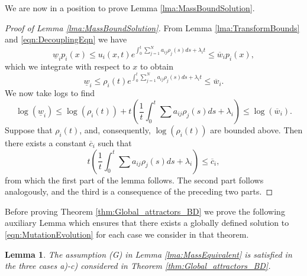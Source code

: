 \documentclass{article}
\newtheorem{lemma}{Lemma}[section]
\begin{document}
We are now in a position to prove Lemma \ref{lma:MassBoundSolution}.

\begin{proof}[Proof of Lemma \ref{lma:MassBoundSolution}]
    From  Lemma \ref{lma:TransformBounds} and \eqref{eqn:DecouplingEqn} we have
\begin{equation}\label{eqn:TransformBounds}
    \underline{w}_ip_i(x)\leq{}u_i(x,t)e^{\int_{0}^ t\sum_{j=1}^Na_{ij}\rho_j(s)ds+\lambda_it}\leq{}\overline{w}_ip_i(x),
\end{equation}
which we integrate with respect to $x$ to obtain
\begin{equation}\label{eqn:MassBounds}
    \underline{w}_i\leq{}\rho_i(t)e^{\int_{0}^ t\sum_{j=1}^Na_{ij}\rho_j(s)ds+\lambda_it}\leq{}\overline{w}_i.
\end{equation}
We now take logs to find
\[\log(\underline{w}_i)\leq{}\log(\rho_i(t))+t\left(\frac{1}{t}\int_{0}^ t\sum_{}a_{ij}\rho_j(s)ds+\lambda_i\right)\leq{}\log(\overline{w}_i).\]
Suppose that $\rho_i(t)$, and, consequently, $\log(\rho_i(t))$ are bounded above. Then there exists a constant  $\overline{c}_i$ such that
\[t\left(\frac{1}{t}\int_{0}^ t\sum_{}a_{ij}\rho_j(s)ds+\lambda_i\right)\leq{}\overline{c}_i,\]
from which the first part of the lemma follows. The second part follows analogously, and the third is a consequence of the preceding two parts.

\end{proof}


Before proving Theorem \ref{thm:Global_attractors_BD} we prove the following auxiliary Lemma which ensures that there exists a globally defined solution to \eqref{eqn:MutationEvolution} for each case we consider in that theorem.

\begin{lemma}\label{lma:BoundedTrajetories}
    The assumption (G) in Lemma \ref{lma:MassEquivalent} is satisfied in the three cases a)-c) considered in Theorem \ref{thm:Global_attractors_BD}.
\end{lemma}
\end{document}

